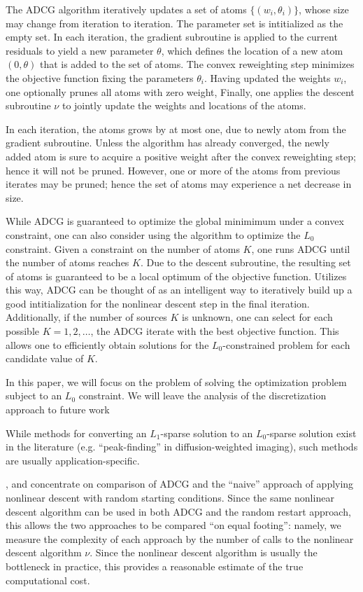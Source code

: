 \documentclass[11pt]{article}
\begin{document}
The ADCG algorithm iteratively updates a set of atoms $\{(w_i,
\theta_i)\}$, whose size may change from iteration to iteration.  The
parameter set is intitialized as the empty set.  In each iteration,
the gradient subroutine is applied to the current residuals to yield a
new parameter $\theta$, which defines the location of a new atom $(0,
\theta)$ that is added to the set of atoms.  The convex reweighting
step minimizes the objective function fixing the parameters
$\theta_i$.  Having updated the weights $w_i$, one optionally prunes
all atoms with zero weight, Finally, one applies the descent
subroutine $\nu$ to jointly update the weights and locations of the
atoms.

In each iteration, the atoms grows by at most one, due to newly atom
from the gradient subroutine.  Unless the algorithm has already
converged, the newly added atom is sure to acquire a positive weight
after the convex reweighting step; hence it will not be pruned.
However, one or more of the atoms from previous iterates may be
pruned; hence the set of atoms may experience a net decrease in size.

While ADCG is guaranteed to optimize the global minimimum under a
convex constraint, one can also consider using the algorithm to
optimize the $L_0$ constraint.  Given a constraint on the number of
atoms $K$, one runs ADCG until the number of atoms reaches $K$.  Due
to the descent subroutine, the resulting set of atoms is guaranteed to
be a local optimum of the objective function.  Utilizes this way, ADCG
can be thought of as an intelligent way to iteratively build up a good
intitialization for the nonlinear descent step in the final iteration.
Additionally, if the number of sources $K$ is unknown, one can select
for each possible $K=1,2,\hdots$, the ADCG iterate with the best
objective function.  This allows one to efficiently obtain solutions
for the $L_0$-constrained problem for each candidate value of $K$.

In this paper, we will focus on the problem of solving the
optimization problem subject to an $L_0$ constraint.  We will leave
the analysis of the discretization approach to future
work\begin{footnote}{While methods for converting an $L_1$-sparse
  solution to an $L_0$-sparse solution exist in the literature
  (e.g. ``peak-finding'' in diffusion-weighted imaging), such methods
  are usually application-specific.}\end{footnote}, and concentrate on
comparison of ADCG and the ``naive'' approach of applying nonlinear
descent with random starting conditions.  Since the same nonlinear
descent algorithm can be used in both ADCG and the random restart
approach, this allows the two approaches to be compared ``on equal
footing'': namely, we measure the complexity of each approach by the
number of calls to the nonlinear descent algorithm $\nu$.  Since the
nonlinear descent algorithm is usually the bottleneck in practice,
this provides a reasonable estimate of the true computational cost.
\end{document}
